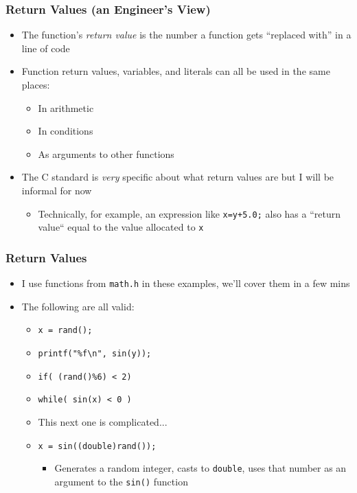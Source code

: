 \documentclass[14pt]{beamer}
\begin{document}
\begin{frame}
\frametitle{Return Values (an Engineer's View)}
\begin{itemize}
\item The function's \textit{return value} is the number a function gets ``replaced with'' in a line of code
\pause
\item Function return values, variables, and literals can all be used in the same places:
	\begin{itemize}
		\item In arithmetic
		\item In conditions
		\item As arguments to other functions
	\end{itemize}	 
\pause
\item The C standard is \textit{very} specific about what return values are but I will be informal for now
	\begin{itemize}
		\item Technically, for example, an expression like \texttt{x=y+5.0;} also has a ``return value`` equal to the value allocated to \texttt{x}
	\end{itemize}
\end{itemize}
\end{frame}

\begin{frame}
\frametitle{Return Values}
\begin{itemize}
\item I use functions from \texttt{math.h} in these examples, we'll cover them in a few mins
\pause
\item The following are all valid:
	\begin{itemize}
		\item \texttt{x = rand();}
		\item \texttt{printf("\%f\textbackslash n", sin(y));}
		\item \texttt{if( (rand()\%6) < 2)}
		\item \texttt{while( sin(x) < 0 )}
		\pause
		\item This next one is complicated...
		\pause
		\item \texttt{x = sin((double)rand());}
			\begin{itemize}
			\pause
				\item Generates a random integer, casts to \texttt{double}, uses that number as an argument to the \texttt{sin()} function
			\end{itemize}
	\end{itemize}
\end{itemize}
\end{frame}
\end{document}
